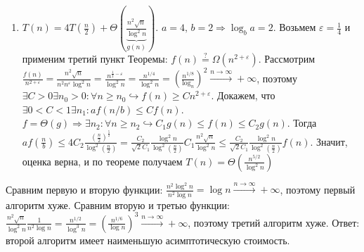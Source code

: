 \documentclass[a4paper]{article}
\def\eps{\varepsilon}
\begin{document}
\begin{enumerate}
\item $T(n)=4T(\frac{n}{2})+\Theta(\underbrace{\frac{n^2\sqrt{n}}{\log^2n}}_{g(n)})$. $a=4,\,b=2\Rightarrow\log_b a=2$. Возьмем $\eps=\frac{1}{4}$ и применим третий пункт Теоремы: $f(n)\overset{?}{=}\Omega(n^{2+\eps})$. Рассмотрим $\frac{f(n)}{n^{2+\eps}}=\frac{n^2\sqrt{n}}{n^2n^\eps\log^2 n}=\frac{n^{\frac{1}{2}-\eps}}{\log^2 n}=\frac{n^{1/4}}{\log^2 n}=(\frac{n^{1/8}}{\log_n})^2\overset{n\to\infty}{\longrightarrow}+\infty$, поэтому $\exists C>0\exists n_0>0\colon \forall n\geqslant n_0\hookrightarrow f(n)\geqslant C n^{2+\eps}$. Докажем, что $\exists 0<C<1\exists n_1\colon af(n/b)\leqslant Cf(n)$. $f=\Theta(g)\Rightarrow\exists n_2\colon\forall n\geqslant n_2\hookrightarrow C_1g(n)\leqslant f(n)\leqslant C_2 g(n)$. Тогда $af(\frac{n}{b})\leqslant 4C_2\frac{(\frac{n}{2})^\frac{5}{2}}{\log^2(\frac{n}{2})}=\frac{C_2}{\sqrt{2}C_1}\frac{\log^2n}{\log^2(\frac{n}{2})}C_1\frac{n^2\sqrt{n}}{\log^2 n}\leqslant \frac{C_2}{\sqrt{2}C_1}\frac{\log^2n}{\log^2(\frac{n}{2})}f(n)$. Значит, оценка верна, и по теореме получаем $T(n)=\boxed{\Theta(\frac{n^{5/2}}{\log^2n})}$
\end{enumerate}
Сравним первую и вторую функции: $\frac{n^2\log^2 n}{n^2\log n}=\log n\overset{n\to\infty}{\longrightarrow}+\infty$, поэтому первый алгоритм хуже. Сравним вторую и третью функции: $\frac{n^2\sqrt{n}}{\log^2n}\frac{1}{n^2\log n}=\frac{n^{1/2}}{\log^3 n}=(\frac{n^{1/6}}{\log n})^3\overset{n\to\infty}{\longrightarrow}+\infty$, поэтому третий алгоритм хуже.\newline
Ответ: $\boxed{\mbox{второй алгоритм}}$ имеет наименьшую асимптотическую стоимость.
\end{document}
